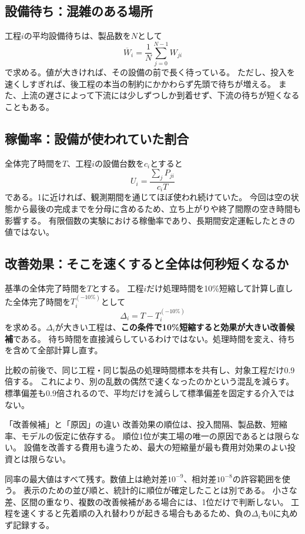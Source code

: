 \documentclass[a4paper,11pt]{ltjsarticle}
\newcommand{\term}[1]{\textbf{#1}}
\begin{document}
\subsection{設備待ち：混雑のある場所}
工程$i$の平均設備待ちは、製品数を$N$として
\[
 \overline{W}_i=\frac{1}{N}\sum_{j=0}^{N-1}W_{ji}
\]
で求める。値が大きければ、その設備の前で長く待っている。
ただし、投入を速くしすぎれば、後工程の本当の制約にかかわらず先頭で待ちが増える。
また、上流の遅さによって下流には少しずつしか到着せず、下流の待ちが短くなることもある。

\subsection{稼働率：設備が使われていた割合}
全体完了時間を$T$、工程$i$の設備台数を$c_i$とすると
\[
 U_i=\frac{\sum_j P_{ji}}{c_i T}
\]
である。1に近ければ、観測期間を通じてほぼ使われ続けていた。
今回は空の状態から最後の完成までを分母に含めるため、立ち上がりや終了間際の空き時間も影響する。
有限個数の実験における稼働率であり、長期間安定運転したときの値ではない。

\subsection{改善効果：そこを速くすると全体は何秒短くなるか}
基準の全体完了時間を$T$とする。
工程$i$だけ処理時間を10\%短縮して計算し直した全体完了時間を$T_i^{(-10\%)}$として
\[
 \Delta_i=T-T_i^{(-10\%)}
\]
を求める。$\Delta_i$が大きい工程は、\term{この条件で10\%短縮すると効果が大きい改善候補}である。
待ち時間を直接減らしているわけではない。処理時間を変え、待ちを含めて全部計算し直す。

比較の前後で、同じ工程・同じ製品の処理時間標本を共有し、対象工程だけ0.9倍する。
これにより、別の乱数の偶然で速くなったのかという混乱を減らす。
標準偏差も0.9倍されるので、平均だけを減らして標準偏差を固定する介入ではない。

\begin{pointbox}{「改善候補」と「原因」の違い}
改善効果の順位は、投入間隔、製品数、短縮率、モデルの仮定に依存する。
順位1位が実工場の唯一の原因であるとは限らない。
設備を改善する費用も違うため、最大の短縮量が最も費用対効果のよい投資とは限らない。
\end{pointbox}

同率の最大値はすべて残す。数値上は絶対差$10^{-9}$、相対差$10^{-8}$の許容範囲を使う。
表示のための並び順と、統計的に順位が確定したことは別である。
小さな差、区間の重なり、複数の改善候補がある場合には、1位だけで判断しない。
工程を速くすると先着順の入れ替わりが起きる場合もあるため、負の$\Delta_i$も0に丸めず記録する。
\end{document}
